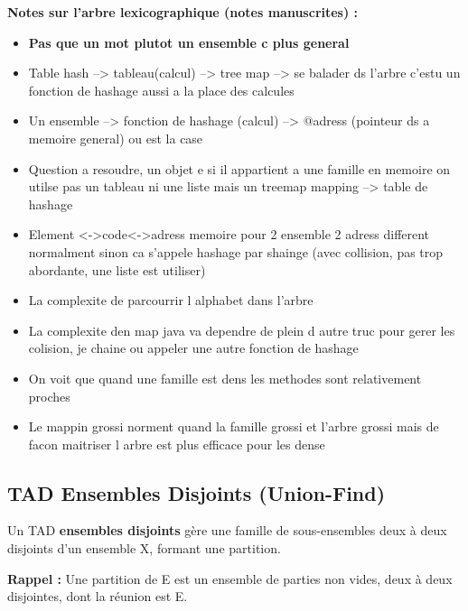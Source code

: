 \documentclass[12pt,a4paper]{article}
\begin{document}
\begin{notecours}
\textbf{Notes sur l'arbre lexicographique (notes manuscrites) :}
\begin{itemize}
    \item \textbf{Pas que un mot plutot un ensemble c plus general}
    \item Table hash --> tableau(calcul) --> tree map --> se balader ds l'arbre c'estu un fonction de hashage aussi a la place des calcules
    \item Un ensemble --> fonction de hashage (calcul) --> @adress (pointeur ds a memoire general) ou est la case
    \item Question a resoudre, un objet e si il appartient a une famille en memoire on utilse pas un tableau ni une liste mais un treemap mapping --> table de hashage
    \item Element <->code<->adress memoire pour 2 ensemble 2 adress different normalment sinon ca s'appele hashage par shainge (avec collision, pas trop abordante, une liste est utiliser)
    \item La complexite de parcourrir l alphabet dans l'arbre
    \item La complexite den map java va dependre de plein d autre truc pour gerer les colision, je chaine ou appeler une autre fonction de hashage
    \item On voit que quand une famille est dens les methodes sont relativement proches
    \item Le mappin grossi norment quand la famille grossi et l'arbre grossi mais de facon maitriser l arbre est plus efficace pour les dense
\end{itemize}
\end{notecours}

\subsection{TAD Ensembles Disjoints (Union-Find)}

\begin{definition}
Un TAD \textbf{ensembles disjoints} gère une famille de sous-ensembles deux à deux disjoints d'un ensemble X, formant une partition.

\textbf{Rappel :} Une partition de E est un ensemble de parties non vides, deux à deux disjointes, dont la réunion est E.
\end{definition}
\end{document}
